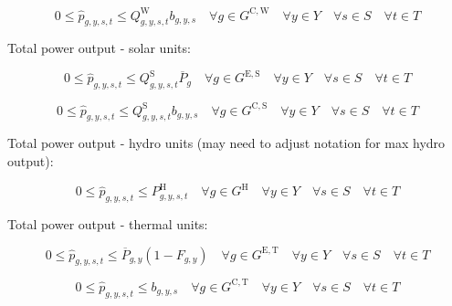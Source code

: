 \documentclass{article}
\newcommand{\sGeneratorsExistingThermal}{G^{\mathrm{E,T}}}
\newcommand{\sGeneratorsExistingSolar}{G^{\mathrm{E,S}}}
\newcommand{\sGeneratorsCandidateThermal}{G^{\mathrm{C,T}}}
\newcommand{\sGeneratorsCandidateWind}{G^{\mathrm{C,W}}}
\newcommand{\sGeneratorsCandidateSolar}{G^{\mathrm{C,S}}}
\newcommand{\sGeneratorsHydro}{G^{\mathrm{H}}}
\newcommand{\sYears}{Y}
\newcommand{\sScenarios}{S}
\newcommand{\sIntervals}{T}
\newcommand{\iGenerator}{g}
\newcommand{\iYear}{y}
\newcommand{\iScenario}{s}
\newcommand{\iInterval}{t}
\newcommand{\cPowerOutputMax}[1][\iGenerator,\iYear]{\overline{P}_{#1}}
\newcommand{\cCapacityFactorWind}[1][\iGenerator,\iYear,\iScenario,\iInterval]{Q_{#1}^{\mathrm{W}}}
\newcommand{\cCapacityFactorSolar}[1][\iGenerator,\iYear,\iScenario,\iInterval]{Q_{#1}^{\mathrm{S}}}
\newcommand{\cRetirementIndicator}[1][\iGenerator,\iYear]{F_{#1}}
\newcommand{\cPowerOutputHydro}[1][\iGenerator,\iYear,\iScenario,\iInterval]{P^{\mathrm{H}}_{#1}}
\newcommand{\vPowerTotal}[1][\iGenerator,\iYear,\iScenario,\iInterval]{\hat{p}_{#1}}
\newcommand{\vInstalledCapacityTotalScenario}[1][\iGenerator,\iYear,\iScenario]{b_{#1}}
\begin{document}
\begin{equation}
0 \leq \vPowerTotal \leq \cCapacityFactorWind \vInstalledCapacityTotalScenario \quad \forall \iGenerator \in \sGeneratorsCandidateWind \quad \forall \iYear \in \sYears \quad \forall \iScenario \in \sScenarios \quad \forall \iInterval \in \sIntervals
\end{equation}

Total power output - solar units:

\begin{equation}
0 \leq \vPowerTotal \leq \cCapacityFactorSolar \cPowerOutputMax[\iGenerator] \quad \forall \iGenerator \in \sGeneratorsExistingSolar \quad \forall \iYear \in \sYears \quad \forall \iScenario \in \sScenarios \quad \forall \iInterval \in \sIntervals 
\end{equation}

\begin{equation}
0 \leq \vPowerTotal \leq \cCapacityFactorSolar \vInstalledCapacityTotalScenario \quad \forall \iGenerator \in \sGeneratorsCandidateSolar \quad \forall \iYear \in \sYears \quad \forall \iScenario \in \sScenarios \quad \forall \iInterval \in \sIntervals
\end{equation}

Total power output - hydro units (may need to adjust notation for max hydro output):

\begin{equation}
0 \leq \vPowerTotal \leq \cPowerOutputHydro \quad \forall \iGenerator \in \sGeneratorsHydro \quad \forall \iYear \in \sYears \quad \forall \iScenario \in \sScenarios \quad \forall \iInterval \in \sIntervals 
\end{equation}

Total power output - thermal units:

\begin{equation}
0 \leq \vPowerTotal \leq \cPowerOutputMax \left(1 - \cRetirementIndicator \right) \quad \forall \iGenerator \in \sGeneratorsExistingThermal \quad \forall \iYear \in \sYears \quad \forall \iScenario \in \sScenarios \quad \forall \iInterval \in \sIntervals
\end{equation}

\begin{equation}
0 \leq \vPowerTotal \leq \vInstalledCapacityTotalScenario \quad \forall \iGenerator \in \sGeneratorsCandidateThermal \quad \forall \iYear \in \sYears \quad \forall \iScenario \in \sScenarios \quad \forall \iInterval \in \sIntervals
\end{equation}
\end{document}
